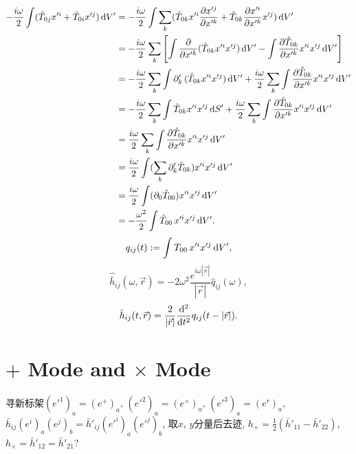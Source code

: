 \begin{align}
    -\frac{i\omega}{2}\int (\hat{T}_{0j}x'^{i}+\hat{T}_{0i}x'^{j})\,\mathrm{d} V'
    &= -\frac{i\omega}{2}\int \sum_{k}(\hat{T}_{0k}x'^{i}\frac{\partial x'^{j}}{\partial x'^{k}}+\hat{T}_{0k}\frac{\partial x'^{i}}{\partial x'^{k}}x'^{j})\,\mathrm{d} V'\\
    &= -\frac{i\omega}{2}\sum_{k}\left[\int \frac{\partial }{\partial x'^k}(\hat{T}_{0k}x'^ix'^j)\,\mathrm{d} V'-\int \frac{\partial \hat{T}_{0k}}{\partial x'^k}x'^ix'^j\,\mathrm{d} V'\right]\\
    &= -\frac{i\omega}{2}\sum_{k}\int \partial'_k\,(\hat{T}_{0k}x'^ix'^j)\,\mathrm{d} V' +\frac{i\omega}{2}\sum_{k}\int \frac{\partial \hat{T}_{0k}}{\partial x'^k}x'^ix'^j\,\mathrm{d} V'\\
    &= -\frac{i\omega}{2}\sum_{k}\int \hat{T}_{0k}x'^ix'^j\,\mathrm{d} S' +\frac{i\omega}{2}\sum_{k}\int \frac{\partial \hat{T}_{0k}}{\partial x'^k}x'^ix'^j\,\mathrm{d} V'\\
    &= \frac{i\omega}{2}\sum_{k}\int \frac{\partial \hat{T}_{0k}}{\partial x'^k}x'^ix'^j\,\mathrm{d} V'\\
    &= \frac{i\omega}{2}\int (\sum_{k}\partial'_k\hat{T}_{0k})x'^ix'^j\,\mathrm{d} V'\\
    &= \frac{i\omega}{2}\int (\partial_0\hat{T}_{00})x'^ix'^j\,\mathrm{d} V'\\
    &= -\frac{\omega^2}{2}\int \hat{T}_{00}\,x'^ix'^j\,\mathrm{d} V'.
\end{align}
\begin{equation}
    q_{ij}(t):=\int{T}_{00}\,x'^ix'^j\,\mathrm{d} V',
\end{equation}
\begin{equation}
    \hat{\bar{h}}_{ij}(\omega,\vec{r}) = -2\omega^2\frac{e^{i\omega\left\lvert\vec{r}\right\rvert}}{\left\lvert\vec{r}\right\rvert}\hat{q}_{ij}(\omega),
\end{equation}
\begin{equation}
    {\bar{h}}_{ij}(t,\vec{r}) = \frac{2}{\left\lvert\vec{r}\right\rvert}
    \frac{\mathrm{d}^2}{\mathrm{d} t^2}{q}_{ij}(t-\left\lvert\vec{r}\right\rvert).\label{qf}
\end{equation}

\section{$+$ Mode and $\times$ Mode}

寻新标架$(e'^1)_a=(e^+)_a$, $(e'^2)_a=(e^\times)_a$, $(e'^3)_a=(e^r)_a$, ${\bar{h}}_{ij}(e^i)_a(e^j)_b={\bar{h}}'_{ij}(e'^i)_a(e'^j)_b$, 取$x$, $y$分量后去迹, $h_+=\frac{1}{2}({\bar{h}}'_{11}-{\bar{h}}'_{22})$, $h_\times={\bar{h}}'_{12}={\bar{h}}'_{21}$? \cite{Sathyaprakash2009}

